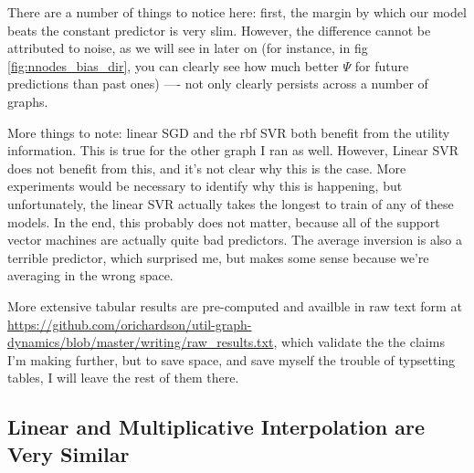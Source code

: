 \documentclass{article}
\theoremstyle{definition}
\begin{document}
	There are a number of things to notice here: first, the margin by which our model beats the constant predictor is very slim. However, the difference cannot be attributed to noise, as we will see in later on (for instance, in fig \ref{fig:nnodes_bias_dir}, you can clearly see how much better $\Psi$ for future predictions than past ones) ---- not only clearly persists across a number of graphs.
	
	More things to note: linear SGD and the rbf SVR both benefit from the utility information. This is true for the other graph I ran as well. However, Linear SVR does not benefit from this, and it's not clear why this is the case. More experiments would be necessary to identify why this is happening, but unfortunately, the linear SVR actually takes the longest to train of any of these models. In the end, this probably does not matter, because all of the support vector machines are actually quite bad predictors. The average inversion is also a terrible predictor, which surprised me, but makes some sense because we're averaging in the wrong space.
	
	More extensive tabular results are pre-computed and availble in raw text form at \url{https://github.com/orichardson/util-graph-dynamics/blob/master/writing/raw\_results.txt}, which validate the the claims I'm making further, but to save space, and save myself the trouble of typsetting tables, I will leave the rest of them there.
	
	
	\subsection{Linear and Multiplicative Interpolation are Very Similar}
	
\end{document}

